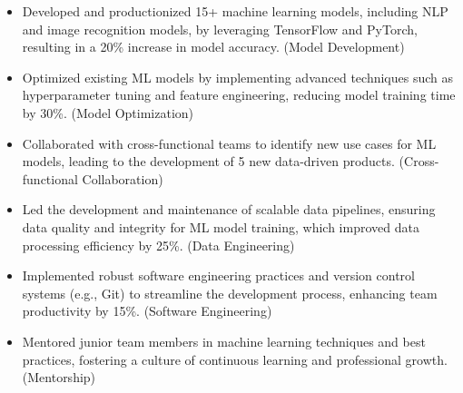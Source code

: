 \documentclass{minimal}
\begin{document}
\begin{adjustwidth}{2em}{0em}
\begin{flushleft}{}\end{flushleft}
\begin{itemize}
    \item Developed and productionized 15+ machine learning models, including NLP and image recognition models, by leveraging TensorFlow and PyTorch, resulting in a 20\% increase in model accuracy. (Model Development)
\end{itemize}
\begin{itemize}
    \item Optimized existing ML models by implementing advanced techniques such as hyperparameter tuning and feature engineering, reducing model training time by 30\%. (Model Optimization)
\end{itemize}
\begin{itemize}
    \item Collaborated with cross{-}functional teams to identify new use cases for ML models, leading to the development of 5 new data{-}driven products. (Cross{-}functional Collaboration)
\end{itemize}
\vspace{0.5em}
\begin{flushleft}{}\end{flushleft}
\begin{itemize}
    \item Led the development and maintenance of scalable data pipelines, ensuring data quality and integrity for ML model training, which improved data processing efficiency by 25\%. (Data Engineering)
\end{itemize}
\begin{itemize}
    \item Implemented robust software engineering practices and version control systems (e.g., Git) to streamline the development process, enhancing team productivity by 15\%. (Software Engineering)
\end{itemize}
\begin{itemize}
    \item Mentored junior team members in machine learning techniques and best practices, fostering a culture of continuous learning and professional growth. (Mentorship)

\end{itemize}
\end{adjustwidth}
\end{document}
